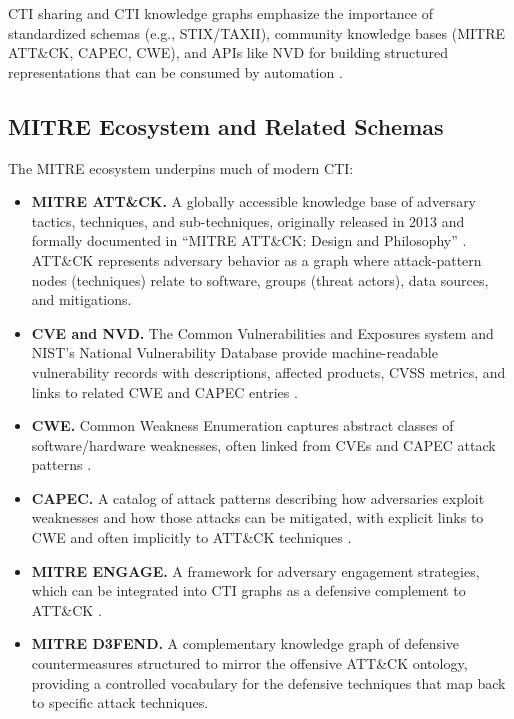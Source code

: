\documentclass[conference]{IEEEtran}
\begin{document}
CTI sharing and CTI knowledge graphs emphasize the importance of standardized schemas (e.g., STIX/TAXII), community knowledge bases (MITRE ATT\&CK, CAPEC, CWE), and APIs like NVD for building structured representations that can be consumed by automation \cite{strom2018mitreattck,mitreCVE,mitreCWE,mitreCAPEC}.

\subsection{MITRE Ecosystem and Related Schemas}

The MITRE ecosystem underpins much of modern CTI:

\begin{itemize}
  \item \textbf{MITRE ATT\&CK.} A globally accessible knowledge base of adversary tactics, techniques, and sub-techniques, originally released in 2013 and formally documented in ``MITRE ATT\&CK: Design and Philosophy'' \cite{strom2018mitreattck}. ATT\&CK represents adversary behavior as a graph where attack-pattern nodes (techniques) relate to software, groups (threat actors), data sources, and mitigations.
  \item \textbf{CVE and NVD.} The Common Vulnerabilities and Exposures system and NIST's National Vulnerability Database provide machine-readable vulnerability records with descriptions, affected products, CVSS metrics, and links to related CWE and CAPEC entries \cite{mitreCVE}.
  \item \textbf{CWE.} Common Weakness Enumeration captures abstract classes of software/hardware weaknesses, often linked from CVEs and CAPEC attack patterns \cite{mitreCWE}.
  \item \textbf{CAPEC.} A catalog of attack patterns describing how adversaries exploit weaknesses and how those attacks can be mitigated, with explicit links to CWE and often implicitly to ATT\&CK techniques \cite{mitreCAPEC}.
  \item \textbf{MITRE ENGAGE.} A framework for adversary engagement strategies, which can be integrated into CTI graphs as a defensive complement to ATT\&CK \cite{cardei2025ift}.
  \item \textbf{MITRE D3FEND.} A complementary knowledge graph of defensive countermeasures structured to mirror the offensive ATT\&CK ontology, providing a controlled vocabulary for the defensive techniques that map back to specific attack techniques.
\end{itemize}
\end{document}
